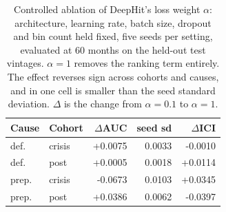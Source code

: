\begin{table}[t]
\caption{Controlled ablation of DeepHit's loss weight $\alpha$: architecture, learning rate, batch size, dropout and bin count held fixed, five seeds per setting, evaluated at 60 months on the held-out test vintages. $\alpha=1$ removes the ranking term entirely. The effect reverses sign across cohorts and causes, and in one cell is smaller than the seed standard deviation. $\Delta$ is the change from $\alpha{=}0.1$ to $\alpha{=}1$.}
\label{tab:alpha}
\centering\footnotesize
\begin{tabular}{@{}llrrr@{}}
\toprule
Cause & Cohort & $\Delta$AUC & seed sd & $\Delta$ICI \\
\midrule
def. & crisis & +0.0075 & 0.0033 & -0.0010 \\
def. & post & +0.0005 & 0.0018 & +0.0114 \\
prep. & crisis & -0.0673 & 0.0103 & +0.0345 \\
prep. & post & +0.0386 & 0.0062 & -0.0397 \\
\bottomrule
\end{tabular}
\end{table}
